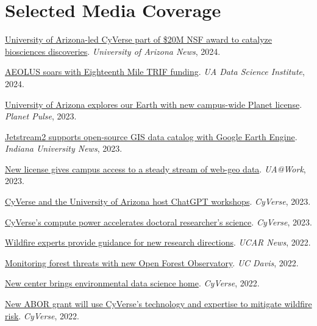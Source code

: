 \documentclass[11pt,letterpaper]{article}
\newenvironment{hanglist}
  {\begin{list}{}{\setlength{\leftmargin}{1.4em}\setlength{\itemindent}{-1.4em}%
     \setlength{\itemsep}{3pt}\setlength{\parsep}{0pt}\setlength{\topsep}{1pt}}}
  {\end{list}}
\begin{document}
\section{Selected Media Coverage}
\begin{hanglist}
\item \href{https://news.arizona.edu/news/uarizona-led-cyverse-part-20m-nsf-award-catalyze-biosciences-discoveries}{University of Arizona-led CyVerse part of \$20M NSF award to catalyze biosciences discoveries}. \textit{University of Arizona News}, 2024.
\item \href{https://datascience.arizona.edu/news/aeolus-soars-eighteenth-mile-trif-funding}{AEOLUS soars with Eighteenth Mile TRIF funding}. \textit{UA Data Science Institute}, 2024.
\item \href{https://www.planet.com/pulse/university-of-arizona-explores-our-earth-with-new-campus-wide-planet-license/}{University of Arizona explores our Earth with new campus-wide Planet license}. \textit{Planet Pulse}, 2023.
\item \href{https://news.iu.edu/it/live/news/31802-jetstream2-supports-open-source-gis-data-catalog-with-}{Jetstream2 supports open-source GIS data catalog with Google Earth Engine}. \textit{Indiana University News}, 2023.
\item \href{https://uaatwork.arizona.edu/lqp/new-license-gives-campus-access-steady-stream-web-geo-data}{New license gives campus access to a steady stream of web-geo data}. \textit{UA@Work}, 2023.
\item \href{https://cyverse.org/cyverse-and-ua-host-chatgpt-workshops}{CyVerse and the University of Arizona host ChatGPT workshops}. \textit{CyVerse}, 2023.
\item \href{https://cyverse.org/cyverses-compute-power-accelerates-doctoral-researchers-science}{CyVerse's compute power accelerates doctoral researcher's science}. \textit{CyVerse}, 2023.
\item \href{https://news.ucar.edu/132859/wildfire-experts-provide-guidance-new-research-directions}{Wildfire experts provide guidance for new research directions}. \textit{UCAR News}, 2022.
\item \href{https://www.ucdavis.edu/climate/blog/monitoring-forest-threats-new-open-forest-observatory}{Monitoring forest threats with new Open Forest Observatory}. \textit{UC Davis}, 2022.
\item \href{https://cyverse.org/esiil-center}{New center brings environmental data science home}. \textit{CyVerse}, 2022.
\item \href{https://cyverse.org/new-abor-grant-will-utilize-cyverse-technology-and-expertise-to-mitigate-wildfire-risk}{New ABOR grant will use CyVerse's technology and expertise to mitigate wildfire risk}. \textit{CyVerse}, 2022.

\end{hanglist}
\end{document}
